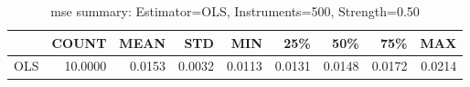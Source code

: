\begin{table}[ht]
\centering
\caption{mse summary: Estimator=OLS, Instruments=500, Strength=0.50}
\begin{tabular}{lrrrrrrrr}
\toprule
 & COUNT & MEAN & STD & MIN & 25\% & 50\% & 75\% & MAX \\
\midrule
OLS & 10.0000 & 0.0153 & 0.0032 & 0.0113 & 0.0131 & 0.0148 & 0.0172 & 0.0214 \\
\bottomrule
\end{tabular}
\end{table}
